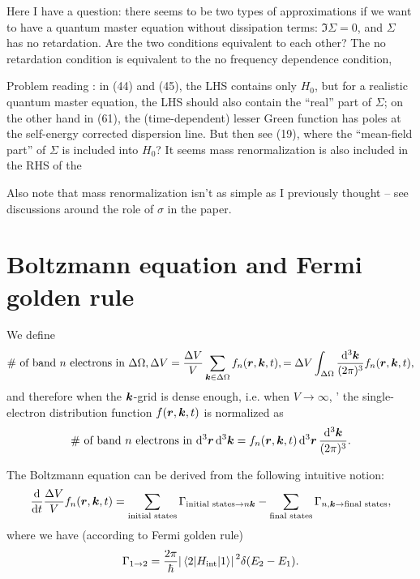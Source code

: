 \documentclass[hyperref, a4paper]{article}
\begin{document}
Here I have a question: 
there seems to be two types of approximations 
if we want to have a quantum master equation without dissipation terms:
$\Im \Sigma = 0$, 
and $\Sigma$ has no retardation.
Are the two conditions equivalent to each other?
The no retardation condition is equivalent to the no frequency dependence condition,

Problem reading \cite{vspivcka2005long}:
in (44) and (45), 
the LHS contains only $H_0$,
but for a realistic quantum master equation,
the LHS should also contain the ``real'' part of $\Sigma$;
on the other hand in (61),
the (time-dependent) lesser Green function 
has poles at the self-energy corrected dispersion line.
But then see (19), where the ``mean-field part'' of $\Sigma$
is included into $H_0$?
It seems mass renormalization is also included in the RHS of the 

Also note that mass renormalization isn't as simple as I previously thought
-- see discussions around the role of $\sigma$ in the paper.

\section{Boltzmann equation and Fermi golden rule}

We define
\[
    \text{\# of band $n$ electrons in $\Delta \Omega, \Delta V$}
    = \frac{\Delta V}{V} \sum_{\vb*{k} \in \Delta \Omega} f_{n} (\vb*{r}, \vb*{k}, t),
    = \Delta V \int_{\Delta \Omega} \frac{\dd[3]{\vb*{k}}}{(2\pi)^3} f_n (\vb*{r}, \vb*{k}, t),
\]
and therefore when the $\vb*{k}$-grid is dense enough, i.e. when $V \to \infty$, '
the single-electron distribution function $f(\vb*{r}, \vb*{k}, t)$ is 
normalized as
\begin{equation}
    \text{\# of band $n$ electrons in $\dd[3]{\vb*{r}} \dd[3]{\vb*{k}}$} 
    = f_n(\vb*{r}, \vb*{k}, t) \dd[3]{\vb*{r}} \frac{\dd[3]{\vb*{k}}}{(2\pi)^3}.
\end{equation}

The Boltzmann equation can be derived from the following intuitive notion:
\[
    \dv{t} \frac{\Delta V}{V} f_n (\vb*{r}, \vb*{k}, t) 
    = \sum_{\text{initial states}} \Gamma_{\text{initial states} \to n \vb*{k}} 
    - \sum_{\text{final states}} \Gamma_{n, \vb*{k} \to \text{final states}} ,
\]
where we have (according to Fermi golden rule)
\begin{equation}
    \Gamma_{1 \to 2} = \frac{2\pi}{\hbar} 
    \abs*{\mel{2}{H_{\text{int}}}{1}}^2 
    \delta(E_2 - E_1).
\end{equation}
\end{document}
